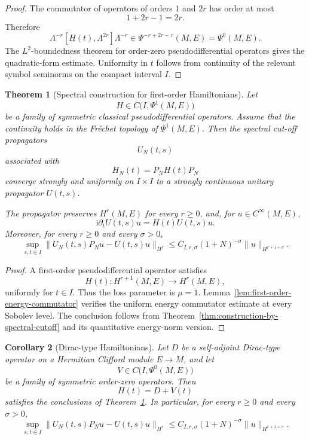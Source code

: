 \documentclass[11pt]{amsart}
\theoremstyle{plain}
\newtheorem{theorem}{Theorem}[section]
\newtheorem{corollary}[theorem]{Corollary}
\theoremstyle{definition}
\theoremstyle{remark}
\begin{document}
\begin{proof}
The commutator of operators of orders \(1\) and \(2r\) has order at most
\[
1+2r-1=2r.
\]
Therefore
\[
\Lambda^{-r}[H(t),\Lambda^{2r}]\Lambda^{-r}
\in
\Psi^{-r+2r-r}(M,E)
=
\Psi^{0}(M,E).
\]
The \(L^{2}\)-boundedness theorem for order-zero pseudodifferential operators
gives the quadratic-form estimate. Uniformity in \(t\) follows from
continuity of the relevant symbol seminorms on the compact interval \(I\).
\end{proof}

\begin{theorem}[Spectral construction for first-order Hamiltonians]
\label{thm:first-order-pseudodifferential-construction}
Let
\[
H\in C\bigl(I,\Psi^{1}(M,E)\bigr)
\]
be a family of symmetric classical pseudodifferential operators. Assume that
the continuity holds in the Fréchet topology of
\(\Psi^{1}(M,E)\). Then the spectral cut-off propagators
\[
U_{N}(t,s)
\]
associated with
\[
H_{N}(t)=P_{N}H(t)P_{N}
\]
converge strongly and uniformly on \(I\times I\) to a strongly continuous
unitary propagator \(U(t,s)\).

The propagator preserves \(H^{r}(M,E)\) for every \(r\geq 0\), and, for
\(u\in C^{\infty}(M,E)\),
\[
\mathrm{i}\partial_{t}U(t,s)u
=
H(t)U(t,s)u.
\]
Moreover, for every \(r\geq 0\) and every \(\sigma>0\),
\[
\sup_{s,t\in I}
\|U_{N}(t,s)P_{N}u-U(t,s)u\|_{H^{r}}
\leq
C_{I,r,\sigma}(1+N)^{-\sigma}
\|u\|_{H^{r+1+\sigma}}.
\]
\end{theorem}

\begin{proof}
A first-order pseudodifferential operator satisfies
\[
H(t):H^{r+1}(M,E)\longrightarrow H^{r}(M,E),
\]
uniformly for \(t\in I\). Thus the loss parameter is \(\mu=1\).
Lemma~\ref{lem:first-order-energy-commutator} verifies the uniform energy
commutator estimate at every Sobolev level. The conclusion follows from
Theorem~\ref{thm:construction-by-spectral-cutoff} and its quantitative
energy-norm version.
\end{proof}

\begin{corollary}[Dirac-type Hamiltonians]
\label{cor:dirac-type-hamiltonians}
Let \(D\) be a self-adjoint Dirac-type operator on a Hermitian Clifford module
\(E\to M\), and let
\[
V\in C\bigl(I,\Psi^{0}(M,E)\bigr)
\]
be a family of symmetric order-zero operators. Then
\[
H(t)=D+V(t)
\]
satisfies the conclusions of
Theorem~\ref{thm:first-order-pseudodifferential-construction}.
In particular, for every \(r\geq 0\) and every \(\sigma>0\),
\[
\sup_{s,t\in I}
\|U_{N}(t,s)P_{N}u-U(t,s)u\|_{H^{r}}
\leq
C_{I,r,\sigma}(1+N)^{-\sigma}
\|u\|_{H^{r+1+\sigma}}.
\]
\end{corollary}
\end{document}

